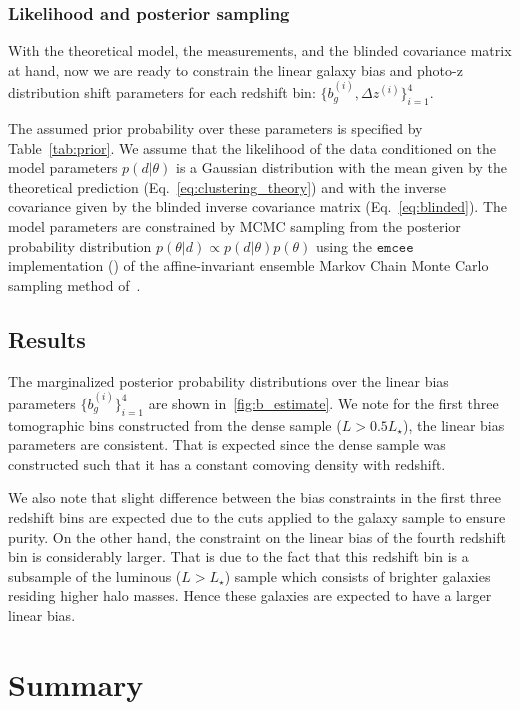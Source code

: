 \documentclass[fleqn,usenatbib,useAMS]{mnras}
\begin{document}
\subsubsection{Likelihood and posterior sampling}

With the theoretical model, the measurements, and the blinded covariance matrix at hand, now we are ready to constrain the linear galaxy bias and photo-z distribution shift parameters for each redshift bin: $\{b_{g}^{(i)}, \Delta z^{(i)}\}_{i=1}^{4}$. 

The assumed prior probability over these parameters is specified by Table~\ref{tab:prior}. We assume that the likelihood of the data conditioned on the model parameters $p(d|\theta)$ is a Gaussian distribution with the mean given by the theoretical prediction (Eq.~\ref{eq:clustering_theory}) and with the inverse covariance given by the blinded inverse covariance matrix (Eq.~\ref{eq:blinded}). The model parameters are constrained by MCMC sampling from the posterior probability distribution $p(\theta | d) \propto p(d|\theta)p(\theta)$ using the $\mathtt{emcee}$ implementation (\citealt{emcee}) of the affine-invariant ensemble Markov Chain Monte Carlo sampling method of~\citet{goodman2010}. 


\subsection{Results}

The marginalized posterior probability distributions over the linear bias parameters $\{b_{g}^{(i)}\}_{i=1}^{4}$ are shown in~\ref{fig:b_estimate}. We note for the first three tomographic bins constructed from the dense sample ($L>0.5 L_{\star}$), the linear bias parameters are consistent. 
That is expected since the dense sample was constructed such that it has a constant comoving density with redshift. 

We also note that slight difference between the bias constraints in the first three redshift bins are expected due to the cuts applied to the galaxy sample to ensure purity. On the other hand, the constraint on the linear bias of the fourth redshift bin is considerably larger. That is due to the fact that this redshift bin is a subsample of the luminous ($L>L_{\star}$) sample which consists of brighter galaxies residing higher halo masses. Hence these galaxies are expected to have a larger linear bias. 

\section{Summary}\label{sec:summary} 
\end{document}
